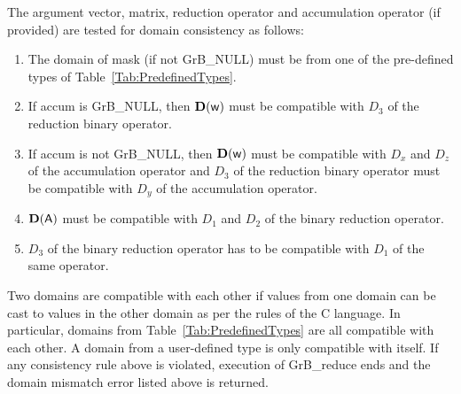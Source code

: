 The argument vector, matrix, reduction operator and accumulation 
operator (if provided) are tested for domain consistency as follows:
\begin{enumerate}
	\item The domain of {\sf mask} (if not {\sf GrB\_NULL}) must be from one of 
    the pre-defined types of Table~\ref{Tab:PredefinedTypes}.

	\item If {\sf accum} is {\sf GrB\_NULL}, then $\bold{D}({\sf w})$ must be 
    compatible with $D_3$ of the reduction binary operator.

	\item If {\sf accum} is not {\sf GrB\_NULL}, then $\bold{D}({\sf w})$ must be
    compatible with $D_x$ and $D_z$ of the accumulation operator and 
    $D_3$ of the reduction binary operator must be compatible with $D_y$ of the accumulation operator.

	\item $\bold{D}({\sf A})$ must be compatible with $D_1$ and $D_2$ of the binary reduction operator.

        \item $D_3$ of the binary reduction operator has to be compatible with $D_1$ of the same operator.
\end{enumerate}
Two domains are compatible with each other if values from one domain can be cast 
to values in the other domain as per the rules of the C language.
In particular, domains from Table~\ref{Tab:PredefinedTypes} are all compatible 
with each other. A domain from a user-defined type is only compatible with itself.
If any consistency rule above is violated, execution of {\sf GrB\_reduce} ends
and the domain mismatch error listed above is returned.

